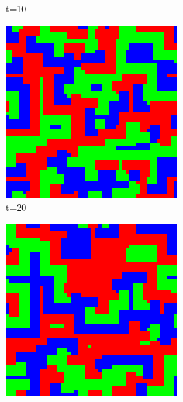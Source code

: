 \documentclass[a4paper, 11pt]{article}
\begin{document}
\begin{landscape}
\begin{figure}[H]
\begin{subfigure}{.20\textwidth}
  \caption{t=10}
\end{subfigure}%
\begin{subfigure}{.20\textwidth}
  \centering
  \includegraphics[width=0.95\linewidth]{ROCK_PAPER_SCISSORS_MOORE_50x50_t20}
  \caption{t=20}
\end{subfigure}%
\begin{subfigure}{.20\textwidth}
  \centering
  \includegraphics[width=0.95\linewidth]{ROCK_PAPER_SCISSORS_MOORE_50x50_t50}

\end{subfigure}
\end{figure}
\end{landscape}
\end{document}
